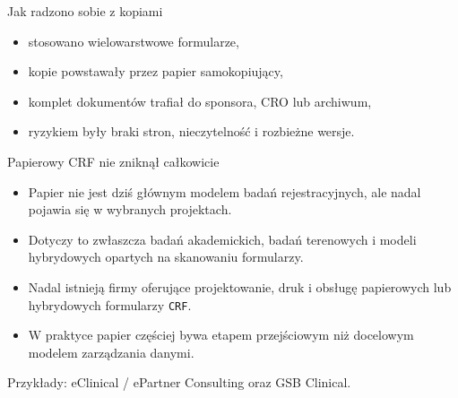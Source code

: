 \begin{frame}{Jak radzono sobie z kopiami}
  \begin{itemize}
    \item stosowano wielowarstwowe formularze,
    \item kopie powstawały przez papier samokopiujący,
    \item komplet dokumentów trafiał do sponsora, CRO lub archiwum,
    \item ryzykiem były braki stron, nieczytelność i rozbieżne wersje.
  \end{itemize}

%
\end{frame}

\begin{frame}{Papierowy CRF nie zniknął całkowicie}
  \begin{itemize}
    \item Papier nie jest dziś głównym modelem badań rejestracyjnych, ale nadal pojawia się w wybranych projektach.
    \item Dotyczy to zwłaszcza badań akademickich, badań terenowych i modeli hybrydowych opartych na skanowaniu formularzy.
    \item Nadal istnieją firmy oferujące projektowanie, druk i obsługę papierowych lub hybrydowych formularzy \texttt{CRF}.
    \item W praktyce papier częściej bywa etapem przejściowym niż docelowym modelem zarządzania danymi.
  \end{itemize}

  \vspace{0.3cm}

  \begin{ExampleBox}
    Przykłady: eClinical / ePartner Consulting oraz GSB Clinical.
  \end{ExampleBox}
\end{frame}

